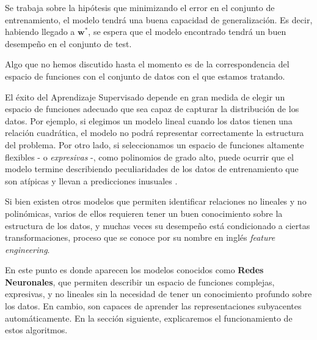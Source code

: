 \documentclass[../../main.tex]{subfiles}
\begin{document}
Se trabaja sobre la hipótesis que minimizando el error en el conjunto de entrenamiento, el
modelo tendrá una buena capacidad de generalización. Es decir, habiendo llegado a
\(\bm{w}^*\), se espera que el modelo encontrado tendrá un buen desempeño en el
conjunto de test.

\bigskip
Algo que no hemos discutido hasta el momento es de la correspondencia del espacio de
funciones con el conjunto de datos con el que estamos tratando.

El éxito del Aprendizaje Supervisado depende en gran medida de elegir un espacio de
funciones adecuado que sea capaz de capturar la distribución de los datos. Por ejemplo, si
elegimos un modelo lineal cuando los datos tienen una relación cuadrática, el modelo no
podrá representar correctamente la estructura del problema. Por otro lado, si
seleccionamos un espacio de funciones altamente flexibles - o \textit{expresivas} -, como
polinomios de grado alto, puede ocurrir que el modelo termine describiendo peculiaridades
de los datos de entrenamiento que son atípicas y llevan a predicciones inusuales
\cite{prince2024understanding}.

Si bien existen otros modelos que permiten identificar relaciones no lineales y no
polinómicas, varios de ellos requieren tener un buen conocimiento sobre la estructura de
los datos, y muchas veces su desempeño está condicionado a ciertas transformaciones,
proceso que se conoce por su nombre en inglés \textit{feature engineering}.

En este punto es donde aparecen los modelos conocidos como \textbf{Redes Neuronales}, que
permiten describir un espacio de funciones complejas, expresivas, y no lineales sin la
necesidad de tener un conocimiento profundo sobre los datos. En cambio, son capaces de
aprender las representaciones subyacentes automáticamente. En la sección siguiente,
explicaremos el funcionamiento de estos algoritmos.
\end{document}
